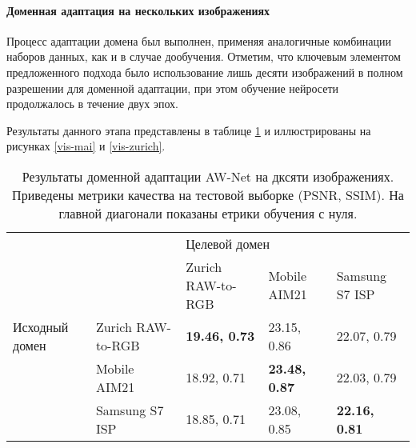 \paragraph{Доменная адаптация на нескольких изображениях}


Процесс адаптации домена был выполнен, применяя аналогичные комбинации наборов данных, как и в случае дообучения. Отметим, что ключевым элементом предложенного подхода было использование лишь десяти изображений в полном разрешении для доменной адаптации, при этом обучение нейросети продолжалось в течение двух эпох.

Результаты данного этапа представлены в таблице \ref{tab:da} и иллюстрированы на рисунках \ref{vis-mai} и \ref{vis-zurich}. 

\begin{table}[H]
    \caption{Результаты доменной адаптации AW-Net на дксяти изображениях. Приведены метрики качества на тестовой выборке (PSNR, SSIM). На главной диагонали показаны етрики обучения с нуля.}\label{tab:da}
    \begin{tabular}{|p{3cm}p{3cm}|p{3cm}p{3cm}p{3cm}|}
        \hline
        \multicolumn{2}{|p{3cm}|}{\multirow{2}{*}{}}                     & \multicolumn{3}{p{5cm}|}{Целевой домен}                                                                          \\ \cline{3-5} 
        \multicolumn{2}{|p{3cm}|}{}                                      & \multicolumn{1}{p{3cm}|}{Zurich RAW-to-RGB}  & \multicolumn{1}{p{3cm}|}{Mobile AIM21}       & Samsung S7 ISP     \\ \hline
        \multicolumn{1}{|p{3cm}|}{Исходный домен}    & Zurich RAW-to-RGB & \multicolumn{1}{p{3cm}|}{\textbf{19.46, 0.73}} & \multicolumn{1}{p{3cm}|}{23.15, 0.86}        & 22.07, 0.79        \\ \cline{2-5} 
        \multicolumn{1}{|p{3cm}|}{}                  & Mobile AIM21      & \multicolumn{1}{p{3cm}|}{18.92, 0.71}        & \multicolumn{1}{p{3cm}|}{\textbf{23.48, 0.87}} & 22.03, 0.79        \\ \cline{2-5} 
        \multicolumn{1}{|p{3cm}|}{}                  & Samsung S7 ISP    & \multicolumn{1}{p{3cm}|}{18.85, 0.71}        & \multicolumn{1}{p{3cm}|}{23.08, 0.85}        & \textbf{22.16, 0.81} \\ \hline
        \end{tabular}
\end{table}


